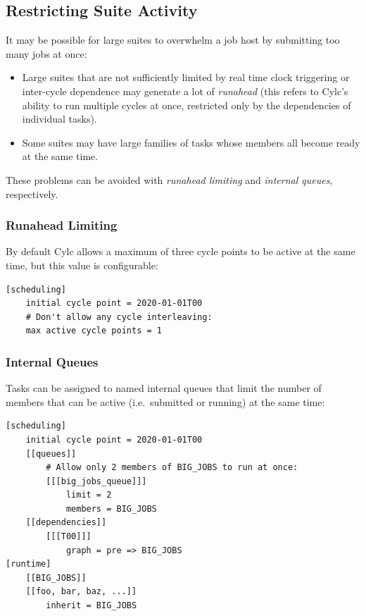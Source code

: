 \subsection{Restricting Suite Activity}
\label{Restricting Suite Activity}

It may be possible for large suites to overwhelm a job host by submitting too
many jobs at once:

\begin{itemize}
  \item Large suites that are not sufficiently limited by real time clock
      triggering or inter-cycle dependence may generate a lot of {\em runahead}
      (this refers to Cylc's ability to run multiple cycles at once, restricted
      only by the dependencies of individual tasks).
  \item Some suites may have large families of tasks whose members all
    become ready at the same time.
\end{itemize}

These problems can be avoided with {\em runahead limiting} and {\em internal
queues}, respectively.

\subsubsection{Runahead Limiting}
\label{Runahead Limiting}

By default Cylc allows a maximum of three cycle points to be active at the same
time, but this value is configurable:

\lstset{language=suiterc}
\begin{lstlisting}
[scheduling]
    initial cycle point = 2020-01-01T00
    # Don't allow any cycle interleaving:
    max active cycle points = 1
\end{lstlisting}

\subsubsection{Internal Queues}

Tasks can be assigned to named internal queues that limit the number of members
that can be active (i.e.\ submitted or running) at the same time:

\lstset{language=suiterc}
\begin{lstlisting}
[scheduling]
    initial cycle point = 2020-01-01T00
    [[queues]]
        # Allow only 2 members of BIG_JOBS to run at once:
        [[[big_jobs_queue]]]
            limit = 2
            members = BIG_JOBS
    [[dependencies]]
        [[[T00]]]
            graph = pre => BIG_JOBS
[runtime]
    [[BIG_JOBS]]
    [[foo, bar, baz, ...]]
        inherit = BIG_JOBS
\end{lstlisting}

